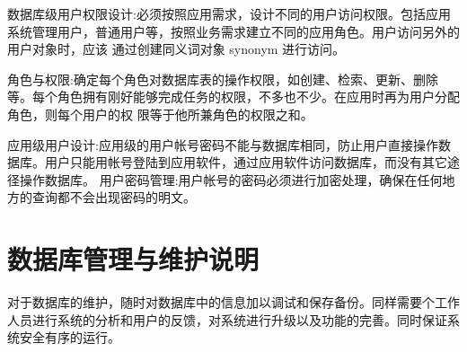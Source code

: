 数据库级用户权限设计:必须按照应用需求，设计不同的用户访问权限。包括应用系统管理用户，普通用户等，按照业务需求建立不同的应用角色。用户访问另外的用户对象时，应该
通过创建同义词对象 synonym 进行访问。

角色与权限:确定每个角色对数据库表的操作权限，如创建、检索、更新、删除等。每个角色拥有刚好能够完成任务的权限，不多也不少。在应用时再为用户分配角色，则每个用户的权
限等于他所兼角色的权限之和。

应用级用户设计:应用级的用户帐号密码不能与数据库相同，防止用户直接操作数据库。用户只能用帐号登陆到应用软件，通过应用软件访问数据库，而没有其它途径操作数据库。
用户密码管理:用户帐号的密码必须进行加密处理，确保在任何地方的查询都不会出现密码的明文。

\section{数据库管理与维护说明}
对于数据库的维护，随时对数据库中的信息加以调试和保存备份。同样需要个工作人员进行系统的分析和用户的反馈，对系统进行升级以及功能的完善。同时保证系统安全有序的运行。